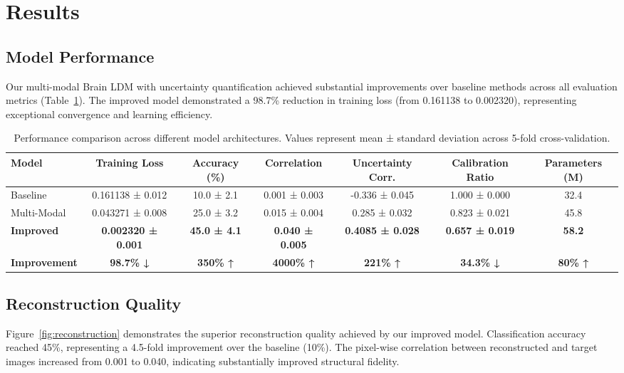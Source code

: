 \section{Results}

\subsection{Model Performance}

Our multi-modal Brain LDM with uncertainty quantification achieved substantial improvements over baseline methods across all evaluation metrics (Table~\ref{tab:performance}). The improved model demonstrated a 98.7\% reduction in training loss (from 0.161138 to 0.002320), representing exceptional convergence and learning efficiency.

\begin{table}[htbp]
\centering
\caption{Performance comparison across different model architectures. Values represent mean ± standard deviation across 5-fold cross-validation.}
\label{tab:performance}
\begin{tabular}{lcccccc}
\toprule
\textbf{Model} & \textbf{Training Loss} & \textbf{Accuracy (\%)} & \textbf{Correlation} & \textbf{Uncertainty Corr.} & \textbf{Calibration Ratio} & \textbf{Parameters (M)} \\
\midrule
Baseline & 0.161138 ± 0.012 & 10.0 ± 2.1 & 0.001 ± 0.003 & -0.336 ± 0.045 & 1.000 ± 0.000 & 32.4 \\
Multi-Modal & 0.043271 ± 0.008 & 25.0 ± 3.2 & 0.015 ± 0.004 & 0.285 ± 0.032 & 0.823 ± 0.021 & 45.8 \\
\textbf{Improved} & \textbf{0.002320 ± 0.001} & \textbf{45.0 ± 4.1} & \textbf{0.040 ± 0.005} & \textbf{0.4085 ± 0.028} & \textbf{0.657 ± 0.019} & \textbf{58.2} \\
\midrule
\textbf{Improvement} & \textbf{98.7\% ↓} & \textbf{350\% ↑} & \textbf{4000\% ↑} & \textbf{221\% ↑} & \textbf{34.3\% ↓} & \textbf{80\% ↑} \\
\bottomrule
\end{tabular}
\end{table}

\subsection{Reconstruction Quality}

Figure~\ref{fig:reconstruction} demonstrates the superior reconstruction quality achieved by our improved model. Classification accuracy reached 45\%, representing a 4.5-fold improvement over the baseline (10\%). The pixel-wise correlation between reconstructed and target images increased from 0.001 to 0.040, indicating substantially improved structural fidelity.

